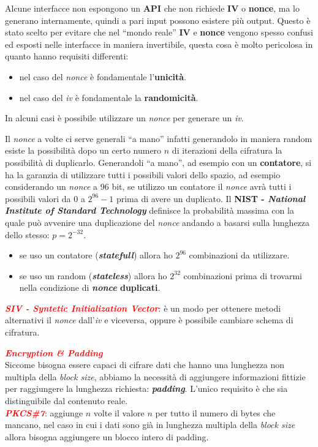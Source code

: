 \begin{flushleft}
    Alcune interfacce non espongono un \textbf{API} che non richiede \textbf{IV} o \textbf{nonce}, ma lo generano internamente, quindi a pari input possono esistere più output. Questo è stato scelto per evitare che nel ``mondo reale'' \textbf{IV} e \textbf{nonce} vengono spesso confusi ed esposti nelle interfacce in maniera invertibile, questa cosa è molto pericolosa in quanto hanno requisiti differenti:
    \begin{itemize}[nosep]
        \item nel caso del \textit{nonce} è fondamentale l'\textbf{unicità}.
        \item nel caso del \textit{iv} è fondamentale la \textbf{randomicità}.
    \end{itemize}
    In alcuni casi è possibile utilizzare un \textit{nonce} per generare un \textit{iv}. 

    \bigskip

    Il \textit{nonce} a volte ci serve generali ``a mano'' infatti generandolo in maniera random esiste la possibilità dopo un certo numero $n$ di iterazioni della cifratura la possibilità di duplicarlo. Generandoli ``a mano'', ad esempio con un \textbf{contatore}, si ha la garanzia di utilizzare tutti i possibili valori dello spazio, ad esempio considerando un \textit{nonce} a 96 bit, se utilizzo un contatore il \textit{nonce} avrà tutti i possibili valori da $0$ a $2^{96} - 1$ prima di avere un duplicato. Il \textbf{NIST - \textit{National Institute of Standard Technology}} definisce la probabilità massima con la quale può avvenire una duplicazione del \textit{nonce} andando a basarsi sulla lunghezza dello stesso: $p = 2^{-32}$.
    \begin{itemize}[nosep]
        \item se uso un contatore (\textbf{\textit{statefull}}) allora ho $2^{96}$ combinazioni da utilizzare.
        \item se uso un random (\textbf{\textit{stateless}}) allora ho $2^{32}$ combinazioni prima di trovarmi nella condizione di \textbf{\textit{nonce} duplicati}.
    \end{itemize}

    \textcolor{red}{\textbf{\textit{SIV - Syntetic Initialization Vector}}}: è un modo per ottenere metodi alternativi il \textit{nonce} dall'\textit{iv} e viceversa, oppure è possibile cambiare schema di cifratura.

    \bigskip

    \textcolor{red}{\textbf{\textit{Encryption \& Padding}}} \\
    Siccome bisogna essere capaci di cifrare dati che hanno una lunghezza non multipla della \textit{block size}, abbiamo la necessità di aggiungere informazioni fittizie per raggiungere la lunghezza richiesta: \textbf{\textit{padding}}. L'unico requisito è che sia distinguibile dal contenuto reale. \\
    \textcolor{red}{\textbf{\textit{PKCS\#7}}}: aggiunge $n$ volte il valore $n$ per tutto il numero di bytes che mancano, nel caso in cui i dati sono già in lunghezza multipla della \textit{block size} allora bisogna aggiungere un blocco intero di padding.
\end{flushleft}